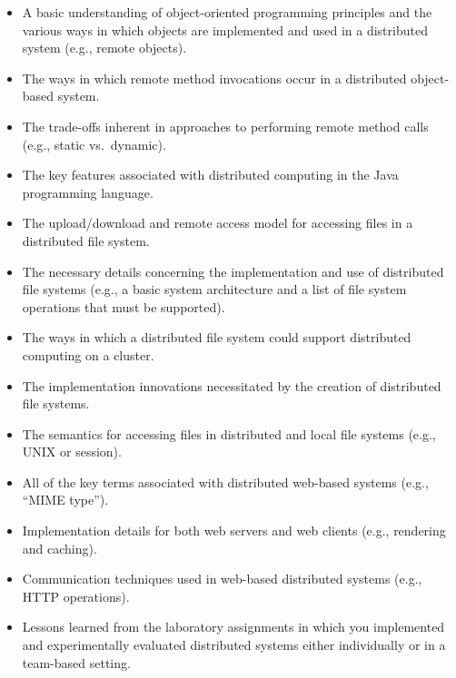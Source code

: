\vspace*{-.05in}
\begin{itemize}

  \itemsep 0in

  \item A basic understanding of object-oriented programming principles and the various ways in which objects are
    implemented and used in a distributed system (e.g., remote objects).

  \item The ways in which remote method invocations occur in a distributed object-based system.

  \item The trade-offs inherent in approaches to performing remote method calls (e.g., static \mbox{vs.\ dynamic}).

  \item The key features associated with distributed computing in the Java programming language.

  \item The upload/download and remote access model for accessing files in a distributed file system.

  \item The necessary details concerning the implementation and use of distributed file systems (e.g., a basic system
    architecture and a list of file system operations that must be supported).

  \item The ways in which a distributed file system could support distributed computing on a cluster.

  \item The implementation innovations necessitated by the creation of distributed file systems.

  \item The semantics for accessing files in distributed and local file systems (e.g., UNIX or session).

  \item All of the key terms associated with distributed web-based systems (e.g., ``MIME type'').

  \item Implementation details for both web servers and web clients (e.g., rendering and caching).

  \item Communication techniques used in web-based distributed systems (e.g., HTTP operations).

  \item Lessons learned from the laboratory assignments in which you implemented and experimentally evaluated
    distributed systems either individually or in a team-based setting.


\end{itemize}

